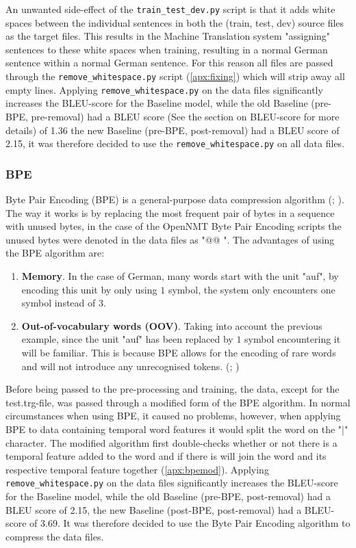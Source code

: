 An unwanted side-effect of the \texttt{train\_test\_dev.py} \cite{dimitarshterionovtrain} script is that it adds white spaces between the individual sentences in both the (train, test, dev) source files as the target files. This results in the Machine Translation system "assigning" sentences to these white spaces when training, resulting in a normal German sentence within a normal German sentence. For this reason all files are passed through the \texttt{remove\_whitespace.py} script (\autoref{apx:fixing}) which will strip away all empty lines. Applying \texttt{remove\_whitespace.py} on the data files significantly increases the BLEU-score for the Baseline model, while the old Baseline (pre-BPE, pre-removal) had a BLEU score (See the section on BLEU-score for more details) of 1.36 the new Baseline (pre-BPE, post-removal) had a BLEU score of 2.15, it was therefore decided to use the \texttt{remove\_whitespace.py} on all data files.


\subsubsection{BPE}

Byte Pair Encoding (BPE) is a general-purpose data compression algorithm (\citealp{sennrich2015neural};  \citealp{gage1994new}). The way it works is by replacing the most frequent pair of bytes in a sequence with unused bytes, in the case of the OpenNMT Byte Pair Encoding \cite{klein-etal-2017-opennmt} scripts the unused bytes were denoted in the data files as "@@ ". The advantages of using the BPE algorithm are:

\begin{enumerate}
    \item \textbf{Memory}. In the case of German, many words start with the unit "auf", by encoding this unit by only using $1$ symbol, the system only encounters one symbol instead of $3$. \cite{gage1994new}
    \item \textbf{Out-of-vocabulary words (OOV)}. Taking into account the previous example, since the unit "auf" has been replaced by $1$ symbol encountering it will be familiar. This is because BPE allows for the encoding of rare words and will not introduce any unrecognised tokens. (\citealp{gage1994new}; \citealp{sennrich2015neural})
\end{enumerate}

Before being passed to the pre-processing and training, the data, except for the test.trg-file, was passed through a modified form of the BPE algorithm. In normal circumstances when using BPE, it caused no problems, however, when applying BPE to data containing temporal word features it would split the word on the "|" character. The modified algorithm first double-checks whether or not there is a temporal feature added to the word and if there is will join the word and its respective temporal feature together (\autoref{apx:bpemod}). Applying \texttt{remove\_whitespace.py} on the data files significantly increases the BLEU-score for the Baseline model, while the old Baseline (pre-BPE, post-removal) had a BLEU score of 2.15, the new Baseline (post-BPE, post-removal) had a BLEU-score of 3.69. It was therefore decided to use the Byte Pair Encoding algorithm to compress the data files.  


